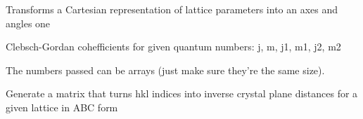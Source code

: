 \documentclass[letterpaper,10pt,english]{sphinxmanual}
\begin{document}

\begin{fulllineitems}
\label{doctree/soprano.utils:soprano.utils.cart2abc}
Transforms a Cartesian representation of lattice parameters
into an axes and angles one

\end{fulllineitems}


\begin{fulllineitems}
\label{doctree/soprano.utils:soprano.utils.clebsch_gordan}
Clebsch-Gordan cohefficients for given quantum numbers:
j, m, j1, m1, j2, m2

The numbers passed can be arrays (just make sure they're the
same size).

\end{fulllineitems}


\begin{fulllineitems}
\label{doctree/soprano.utils:soprano.utils.hkl2d2_matgen}
Generate a matrix that turns hkl indices into inverse crystal
plane distances for a given lattice in ABC form

\end{fulllineitems}


\begin{fulllineitems}
\label{doctree/soprano.utils:soprano.utils.import_module}
\end{fulllineitems}


\begin{fulllineitems}
\label{doctree/soprano.utils:soprano.utils.inspect_args}
\end{fulllineitems}
\end{document}
